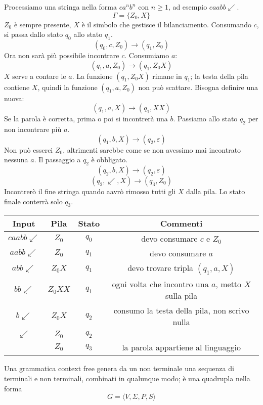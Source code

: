 \documentclass[11pt]{article}
\begin{document}
Processiamo una stringa nella forma $ca^nb^n$ con $n\geq 1$, ad esempio $caabb\swarrow$. 
\begin{equation*}
    \Gamma=\{Z_0,X\}
\end{equation*}
$Z_0$ è sempre presente, $X$ è il simbolo che gestisce il bilanciamento. Consumando $c$, si passa dallo stato $q_0$ allo 
stato $q_1$.
\begin{equation*}
    (q_0,c,Z_0)\rightarrow(q_1,Z_0)
\end{equation*}
Ora non sarà più possibile incontrare $c$. Consumiamo $a$:
\begin{equation*}
    (q_1,a,Z_0)\rightarrow(q_1,Z_0X)
\end{equation*}
$X$ serve a contare le $a$. La funzione $(q_1,Z_0X)$ rimane in $q_1$; la testa della pila contiene $X$, quindi la funzione
$(q_1,a,Z_0)$ non può scattare. Bisogna definire una nuova:
\begin{equation*}
    (q_1,a,X)\rightarrow(q_1,XX)
\end{equation*}
Se la parola è corretta, prima o poi si incontrerà una $b$. Passiamo allo stato $q_2$ per non incontrare più $a$.
\begin{equation*}
    (q_1,b,X)\rightarrow(q_2,\varepsilon)
\end{equation*}
Non può esserci $Z_0$, altrimenti sarebbe come se non avessimo mai incontrato nessuna $a$. Il passaggio a $q_2$ è obbligato.
\begin{equation*}
    (q_2,b,X)\rightarrow(q_2,\varepsilon)
\end{equation*}
\begin{equation*}
    (q_2,\swarrow,X)\rightarrow(q_3,Z_0)
\end{equation*}
Incontrerò il fine stringa quando aavrò rimosso tutti gli $X$ dalla pila. Lo stato finale conterrà solo $q_3$.
\begin{center}
    \begin{tabular}{ |c|c|c|c| } 
     \hline
     Input & Pila & Stato & Commenti \\ 
     \hline\hline
     $caabb\swarrow$ & $Z_0$ & $q_0$ & devo consumare $c$ e $Z_0$ \\ 
     $aabb\swarrow$ & $Z_0$ & $q_1$ & devo consumare $a$ \\ 
     $abb\swarrow$ & $Z_0X$ & $q_1$ & devo trovare tripla $(q_1,a,X)$ \\ 
     $bb\swarrow$ & $Z_0XX$ & $q_1$ & ogni volta che incontro una $a$, metto $X$ sulla pila \\ 
     $b\swarrow$ & $Z_0X$ & $q_2$ & consumo la testa della pila, non scrivo nulla \\ 
     $\swarrow$ & $Z_0$ & $q_2$ & \\ 
     $ $ & $Z_0$ & $q_3$ & la parola appartiene al linguaggio \\ 
     \hline
    \end{tabular}
\end{center}

Una grammatica context free genera da un non terminale una sequenza di terminali e non terminali, combinati in qualunque 
modo; è una quadrupla nella forma 
\begin{equation*}
    G=\langle V,\Sigma,P,S\rangle
\end{equation*}
\end{document}
